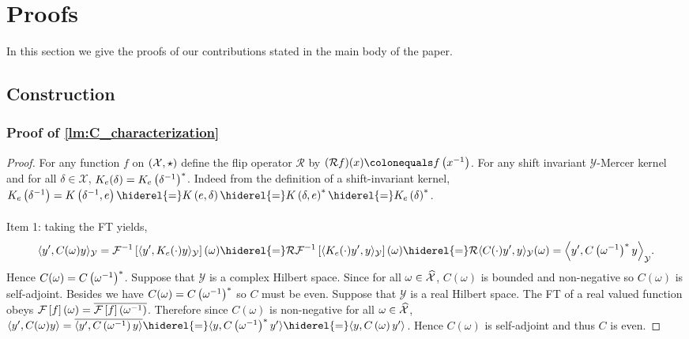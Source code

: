 
\section{Proofs}
In this section we give the proofs of our contributions stated in the main body
of the paper.
\subsection{Construction}
\subsubsection{Proof of \texorpdfstring{\cref{lm:C_characterization}}{Lemma %
\ref{lm:C_characterization}}}
\begin{proof}
    For any function $f$ on $(\mathcal{X},\star)$ define the flip operator
    $\mathcal{R}$ by $(\mathcal{R}f)(x) \colonequals f\left(\inv{x}\right)$.
    For any shift invariant $\mathcal{Y}$-Mercer kernel and for all
    $\delta\in\mathcal{X}$,
    $K_e(\delta)=K_e\left({\delta}^{-1}\right)^*$. Indeed from the
    definition of a shift-invariant kernel,
    $K_e\left(\inv{\delta}\right)=K\left(\inv{\delta},e\right)
    \hiderel{=}K\left(e,\delta\right)
    \hiderel{=}K\left(\delta,e\right)^\adjoint
    \hiderel{=}K_e\left(\delta\right)^\adjoint$.
    \paragraph{}
    Item 1: taking the \acl{FT} yields,
    \begin{dmath*}
        \inner{y',C(\omega)y}_{\mathcal{Y}}=\IFT{\inner{y',
        K_e(\cdot)y}_{\mathcal{Y}}}(\omega)
        \hiderel{=}\mathcal{R}\IFT{\inner{K_e(\cdot)y',
        y}_{\mathcal{Y}}}(\omega)
        \hiderel{=}\mathcal{R}\inner{C(\cdot)y',y}_{\mathcal{Y}}(\omega)
        =\inner*{y',C\left(\inv{\omega}\right)^\adjoint y}_{\mathcal{Y}}.
    \end{dmath*}
    Hence $C(\omega)=C\left({\omega}^{-1}\right)^*$. Suppose that
    $\mathcal{Y}$ is a complex Hilbert space. Since for all
    $\omega\in\mathcal{\widehat{X}}$, $C(\omega)$ is bounded and non-negative so
    $C(\omega)$ is self-adjoint. Besides we have
    $C(\omega)=C\left({\omega}^{-1}\right)^* $ so $C$ must be even.
    Suppose that $\mathcal{Y}$ is a real Hilbert space. The \acl{FT} of a real
    valued function obeys
    $\mathcal{F}\left[f\right](\omega)=\overline{\mathcal{F}\left[f\right]\left({\omega}^{-1}\right)}$. Therefore since
    $C(\omega)$ is non-negative for all $\omega\in\widehat{\mathcal{X}}$,
    $\inner{y', C(\omega)y} = \conj{\inner{y', C\left(\inv{\omega}\right)y}}
    \hiderel{=}\inner{y, C\left(\inv{\omega}\right)^* y'} \hiderel{=}\inner{y,
    C\left(\omega\right) y'}$.  Hence $C(\omega)$ is self-adjoint and thus $C$
    is even.

\end{proof}
